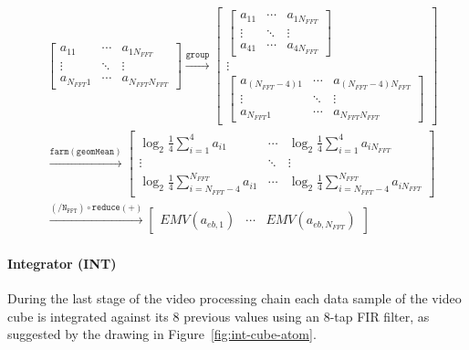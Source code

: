 \documentclass[
  a4paper,
]{article}
\let\oldparagraph\paragraph
\renewcommand{\paragraph}[1]{\oldparagraph{#1}\mbox{}}
\begin{document}
\begin{equation}\begin{aligned}
  &\begin{bmatrix}
  a_{11} & \cdots & a_{1N_{FFT}} \\
  \vdots  & \ddots & \vdots \\
  a_{N_{FFT}1}  & \cdots & a_{N_{FFT}N_{FFT}}
  \end{bmatrix}
  \stackrel{\mathtt{group}}{\rightarrow}
  \begin{bmatrix}
  \begin{bmatrix}
  a_{11} & \cdots & a_{1N_{FFT}} \\
  \vdots & \ddots & \vdots \\
  a_{41} & \cdots & a_{4N_{FFT}}
  \end{bmatrix}\\
  \vdots \\
  \begin{bmatrix}
  a_{(N_{FFT}-4)1}  & \cdots & a_{(N_{FFT}-4)N_{FFT}}\\
  \vdots & \ddots & \vdots \\
  a_{N_{FFT}1}  & \cdots & a_{N_{FFT}N_{FFT}}
  \end{bmatrix}
  \end{bmatrix}\\
  &\stackrel{\mathtt{farm(geomMean)}}{\rightarrow}
  \begin{bmatrix}
  \log_2\frac{1}{4}\sum_{i=1}^{4}a_{i1} & \cdots & \log_2\frac{1}{4}\sum_{i=1}^{4}a_{iN_{FFT}} \\
  \vdots & \ddots & \vdots \\
  \log_2\frac{1}{4}\sum_{i=N_{FFT}-4}^{N_{FFT}}a_{i1} & \cdots & \log_2\frac{1}{4}\sum_{i=N_{FFT}-4}^{N_{FFT}}a_{iN_{FFT}}
  \end{bmatrix}\\
  &\stackrel{\mathtt{(/N_{FFT})\circ reduce(+)}}{\rightarrow}
  \begin{bmatrix}
  EMV(a_{eb,1}) & \cdots & EMV(a_{eb,N_{FFT}}) 
  \end{bmatrix}
  \end{aligned}
\label{eq:cfar-emv}\end{equation}

\hypertarget{sec:int-atom}{%
\paragraph{Integrator (INT)}\label{sec:int-atom}}

During the last stage of the video processing chain each data sample of
the video cube is integrated against its 8 previous values using an
8-tap FIR filter, as suggested by the drawing in
Figure~\ref{fig:int-cube-atom}.
\end{document}
